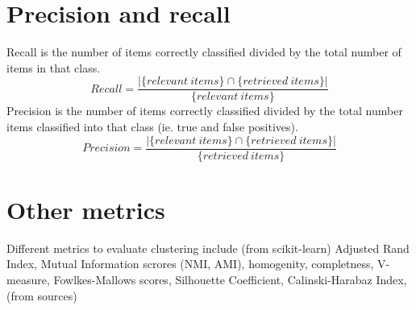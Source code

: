 \section{Precision and recall}
Recall is the number of items correctly classified divided by the 
total number of items in that class.
\begin{equation}
 Recall = \frac{|\{relevant\ items\} \cap \{retrieved\ items\}|} 
{\{relevant\ items\}}
\end{equation}
Precision is the number of items correctly classified divided by 
the total number items classified into that class (ie. true and 
false positives).
\begin{equation}
 Precision = \frac{|\{relevant\ items\} \cap \{retrieved\ 
items\}|} 
{\{retrieved\ items\}}
\end{equation}


\section{Other metrics}
Different metrics to evaluate clustering include (from 
scikit-learn) Adjusted Rand Index, Mutual Information scrores 
(NMI, AMI), homogenity, completness, V-measure, Fowlkes-Mallows 
scores, Silhouette Coefficient, Calinski-Harabaz Index, (from 
sources) 

